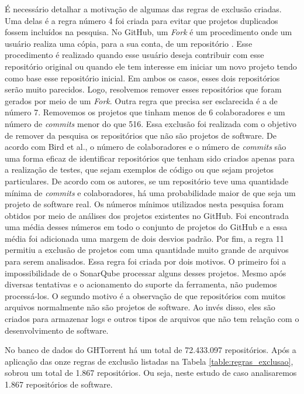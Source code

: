 É necessário detalhar a motivação de algumas das regras de exclusão criadas. Uma delas é a regra número 4 foi criada para evitar que projetos duplicados fossem incluídos na pesquisa. No GitHub, um \textit{Fork} é um procedimento onde um usuário realiza uma cópia, para a sua conta, de um repositório \cite{thung2013network}. Esse procedimento é realizado quando esse usuário deseja contribuir com esse repositório original ou quando ele tem interesse em iniciar um novo projeto tendo como base esse repositório inicial. Em ambos os casos, esses dois repositórios serão muito parecidos. Logo, resolvemos remover esses repositórios que foram gerados por meio de um \textit{Fork}. Outra regra que precisa ser esclarecida é a de número 7. Removemos os projetos que tinham menos de 6 colaboradores e um número de \textit{commits} menor do que 516. Essa exclusão foi realizada com o objetivo de remover da pesquisa os repositórios que não são projetos de software. De acordo com Bird et al.\cite{bird2009promises}, o número de colaboradores e o número de \textit{commits} são uma forma eficaz de identificar repositórios que tenham sido criados apenas para a realização de testes, que sejam exemplos de código ou que sejam projetos particulares. De acordo com os autores,  se um repositório teve uma quantidade mínima de \textit{commits} e colaboradores, há uma probabilidade maior de que seja um projeto de software real. Os números mínimos utilizados nesta pesquisa foram obtidos por meio de análises dos projetos existentes no GitHub. Foi encontrada uma média desses números em todo o conjunto de projetos do GitHub e a essa média foi adicionada uma margem de dois desvios padrão. Por fim, a regra 11 permitiu a exclusão de projetos com uma quantidade muito grande de arquivos para serem analisados. Essa regra foi criada por dois motivos. O primeiro foi a impossibilidade de o SonarQube processar alguns desses projetos. Mesmo após diversas tentativas e o acionamento do suporte da ferramenta, não pudemos processá-los. O segundo motivo é a observação de que repositórios com muitos arquivos normalmente não são projetos de software. Ao invés disso, eles são criados para armazenar logs e outros tipos de arquivos que não tem relação com o desenvolvimento de software.

No banco de dados do GHTorrent há um total de 72.433.097 repositórios. Após a aplicação das onze regras de exclusão listadas na Tabela \ref{table:regras_exclusao}, sobrou um total de 1.867 repositórios.  Ou seja, neste estudo de caso analisaremos 1.867 repositórios de software.





